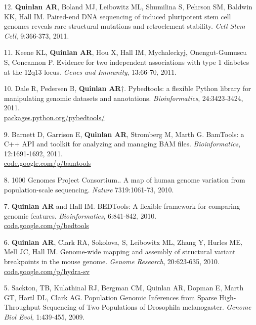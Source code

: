 \documentclass[margin,line]{cv}
\begin{document}
\begin{resume}
\begin{list}{*}{}
    \item[12.] \textbf{Quinlan AR}, Boland MJ, Leibowitz ML, Shumilina S, Pehrson SM, Baldwin KK, Hall IM. 
    Paired-end DNA sequencing of induced pluripotent stem cell genomes reveals rare structural mutations and retroelement stability. 
    \textit{Cell Stem Cell}, 9:366-373, 2011.
    
    \item[11.] Keene KL, \textbf{Quinlan AR}, Hou X, Hall IM, Mychaleckyj, Onengut-Gumuscu S, Concannon P.
    Evidence for two independent associations with type 1 diabetes at the 12q13 locus. 
    \textit{Genes and Immunity}, 13:66-70, 2011.

    \item[10.] Dale R, Pedersen B, \textbf{Quinlan AR}$\dagger$. 
    Pybedtools: a flexible Python library for manipulating genomic datasets and annotations. 
    \textit{Bioinformatics}, 24:3423-3424, 2011.\\
    \url{packages.python.org/pybedtools/}
    
    \item[9.] Barnett D, Garrison E, \textbf{Quinlan AR}, Stromberg M, Marth G.
    BamTools: a C++ API and toolkit for analyzing and managing BAM files.
    \textit{Bioinformatics}, 12:1691-1692, 2011.\\
    \url{code.google.com/p/bamtools}

    \item[8.] 1000 Genomes Project Consortium.. 
    A map of human genome variation from population-scale sequencing. 
    \textit{Nature} 7319:1061-73, 2010.

    \item[7.] \textbf{Quinlan AR} and Hall IM.
    BEDTools: A flexible framework for comparing genomic features. 
    \textit{Bioinformatics}, 6:841-842, 2010.\\
    \url{code.google.com/p/bedtools}

    \item[6.] \textbf{Quinlan AR}, Clark RA, Sokolova, S, Leibowitx ML, Zhang Y, Hurles ME, Mell JC, Hall IM. 
    Genome-wide mapping and assembly of structural variant breakpoints in the mouse genome. 
    \textit{Genome Research}, 20:623-635, 2010.\\
    \url{code.google.com/p/hydra-sv}

    \item[5.] Sackton, TB, Kulathinal RJ, Bergman CM, Quinlan AR, Dopman E, Marth GT, Hartl DL, Clark AG. 
    Population Genomic Inferences from Sparse High-Throughput Sequencing of Two Populations of Drosophila melanogaster. 
    \textit{Genome Biol Evol}, 1:439-455, 2009.


\end{list}
\end{resume}
\end{document}
